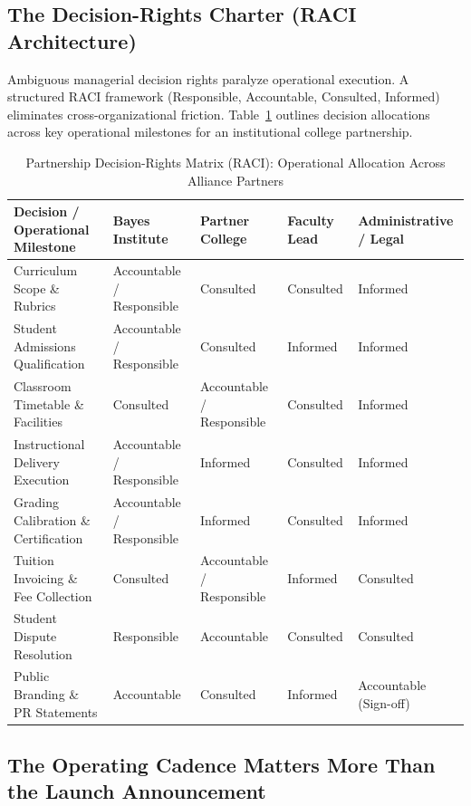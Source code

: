 \subsection{The Decision-Rights Charter (RACI Architecture)}
\label{sec:decision_rights_charter}

Ambiguous managerial decision rights paralyze operational execution. A structured RACI framework (Responsible, Accountable, Consulted, Informed) eliminates cross-organizational friction. Table~\ref{tab:partnership_raci_charter} outlines decision allocations across key operational milestones for an institutional college partnership.

\begin{table}[t]
\centering
\small
\caption{Partnership Decision-Rights Matrix (RACI): Operational Allocation Across Alliance Partners}
\label{tab:partnership_raci_charter}
\begin{tabularx}{\textwidth}{p{3.8cm} p{2.8cm} p{2.8cm} p{2.4cm} X}
\toprule
\textbf{Decision / Operational Milestone} & \textbf{Bayes Institute} & \textbf{Partner College} & \textbf{Faculty Lead} & \textbf{Administrative / Legal} \\
\midrule
Curriculum Scope \& Rubrics & Accountable / Responsible & Consulted & Consulted & Informed \\
Student Admissions Qualification & Accountable / Responsible & Consulted & Informed & Informed \\
Classroom Timetable \& Facilities & Consulted & Accountable / Responsible & Consulted & Informed \\
Instructional Delivery Execution & Accountable / Responsible & Informed & Consulted & Informed \\
Grading Calibration \& Certification & Accountable / Responsible & Informed & Consulted & Informed \\
Tuition Invoicing \& Fee Collection & Consulted & Accountable / Responsible & Informed & Consulted \\
Student Dispute Resolution & Responsible & Accountable & Consulted & Consulted \\
Public Branding \& PR Statements & Accountable & Consulted & Informed & Accountable (Sign-off) \\
\bottomrule
\end{tabularx}
\end{table}

\subsection{The Operating Cadence Matters More Than the Launch Announcement}
\label{sec:operating_cadence_governance}

